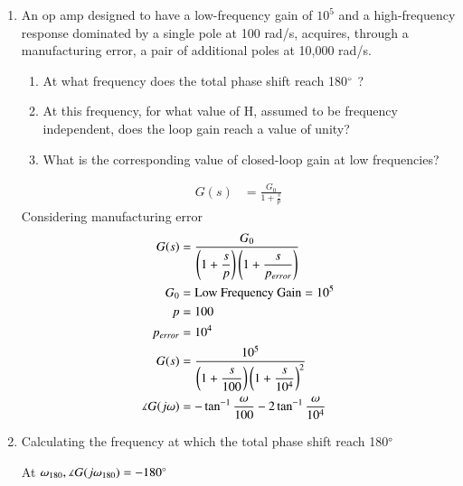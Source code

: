\begin{enumerate}[label=\thesection.\arabic*.,ref=\thesection.\theenumi]
\item An op amp designed to have a low-frequency gain of $10^{5}$ and a high-frequency response dominated by a single pole at 100 rad/s, acquires, through a manufacturing error, a pair of additional poles at 10,000 rad/s. 
\begin{enumerate}
\item At what frequency does the total phase shift reach 180$\degree$ ? 
\item At this frequency, for what value of H, assumed to be frequency independent, does the loop gain reach a value of unity? 
\item What is the corresponding value of closed-loop gain at low frequencies?
\end{enumerate}
\solution
\begin{align}
G(s) &= \frac{G_{0}}{1+\frac{s}{p}} 
\end{align}
Considering manufacturing error
\begin{align}
G(s) &= \dfrac{G_{0}}{\left(1+\dfrac{s}{p}\right)\left(1+\dfrac{s}{p_{error}}\right)} 
\\
G_{0} &= \text{Low Frequency Gain} = 10^{5}
\\
p &= 100
\\
p_{error} &= 10^{4}
\\
G(s) &= \dfrac{10^{5}}{\left(1+\dfrac{s}{100}\right)\left(1+\dfrac{s}{10^{4}}\right)^{2}}
\\
\measuredangle G(j\omega) &= -\tan^{-1}\frac{\omega}{100} - 2\tan^{-1}\frac{\omega}{10^{4}}
\end{align}
\item Calculating the frequency at which the total phase shift reach 180$\degree$ 

At $\omega_{180}, \measuredangle G(j\omega_{180}) = -180\degree$


\end{enumerate}
